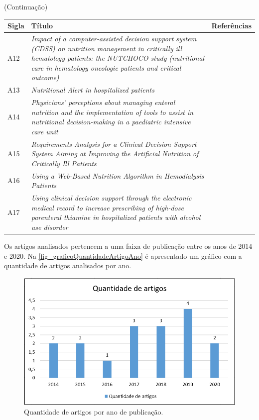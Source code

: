 \clearpage
\begin{quadro}[htb]
(Continuação)
\begin{tabular}{|p{1cm}|p{8cm}|p{5cm}|}
    \hline
    \textbf{Sigla} & \textbf{Título} & \textbf{Referências} \\ \hline
	A12  & \textit{Impact of a computer-assisted decision support system (CDSS) on nutrition management in critically ill hematology patients: the NUTCHOCO study (nutritional care in hematology oncologic patients and critical outcome)} & \cite{ettori2019} \\ \hline
	A13  & \textit{Nutritional Alert in hospitalized patients} & \cite{brieux2014} \\ \hline
	A14  & \textit{Physicians' perceptions about managing enteral nutrition and the implementation of tools to assist in nutritional decision-making in a paediatric intensive care unit}& \cite{moullet2020} \\ \hline
	A15  & \textit{Requirements Analysis for a Clinical Decision Support System Aiming at Improving the Artificial Nutrition of Critically Ill Patients}& \cite{schuttler2017} \\ \hline
	A16  & \textit{Using a Web-Based Nutrition Algorithm in Hemodialysis Patients} & \cite{steiber2015} \\ \hline
	A17  & \textit{Using clinical decision support through the electronic medical record to increase prescribing of high-dose parenteral thiamine in hospitalized patients with alcohol use disorder} & \cite{wai2019} \\ \hline
\end{tabular}
\end{quadro} 

Os artigos analisados pertencem a uma faixa de publicação entre os anos de 2014 e 2020. Na \autoref{fig_graficoQuantidadeArtigoAno} é apresentado um gráfico com a quantidade de artigos analisados por ano.

\begin{figure}[htb]
	\caption{\label{fig_graficoQuantidadeArtigoAno}Quantidade de artigos por ano de publicação.}
	\begin{center}
	    \includegraphics[scale=0.5]{Imagens/grafico - quantidade de artigos por ano de publicacao.png}
	\end{center}
\end{figure}

